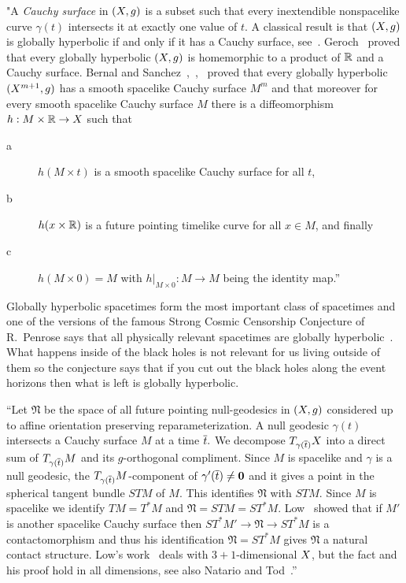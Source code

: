 \documentclass[12pt,reqno,a4paper]{amsart}
\begin{document}
"A {\it Cauchy surface\/} in $(\ss, g)$ is a subset such that every inextendible nonspacelike curve 
$\gamma(t)$ intersects it at exactly one value of $t.$ A classical result is that $(\ss, g)$ is globally 
hyperbolic if and only if it has a Cauchy surface, see~\cite[pages 211-212]{HawkingEllis}. 
Geroch~\cite{Geroch} proved that every globally hyperbolic $(\ss, g)$ is homemorphic to a product of $\R$ 
and a Cauchy surface. Bernal and Sanchez~\cite[Theorem 1]{BernalSanchez},~\cite[Theorem
1.1]{BernalSanchezMetricSplitting},~\cite[Theorem 1.2]{BernalSanchezFurther} proved that every globally 
hyperbolic $(\ss^{m+1}, g)$ has a smooth spacelike Cauchy surface $M^m$ and that moreover
for every smooth spacelike Cauchy surface $M$ there is a
diffeomorphism  $h:M\times \R\to \ss$ such that 
\begin{description}
\item[a] $h(M\times t)$ is a smooth spacelike Cauchy surface
for all $t$, 
\item[b] $h(x\times \R)$ is a future pointing timelike curve for all $x\in M$, and finally 
\item[c] $h(M\times 0)=M$ with $h|_{M\times 0}:M\to M$ being the identity map.''
\end{description}


Globally hyperbolic spacetimes form the most important class of spacetimes and one of the versions of the famous Strong Cosmic Censorship Conjecture of R.~Penrose says that all physically relevant spacetimes are globally hyperbolic~\cite{Penrose}. What happens inside of the black holes is not relevant for us living outside of them so the conjecture says that if you cut out the black holes along the event horizons then what is left is globally hyperbolic.


``Let $\mathfrak N$ be the space of all future pointing null-geodesics in $(\ss, g)$ considered up to affine 
orientation preserving reparameterization.
A null geodesic $\gamma(t)$ intersects a Cauchy surface $M$ at a 
time $\ov t.$ We decompose $T_{\gamma(\ov t)}\ss$ into a direct sum of $T_{\gamma(\ov t)}M$ and its 
$g$-orthogonal compliment. Since $M$ is spacelike and $\gamma$ is a null geodesic, 
the $T_{\gamma(\ov t)}M$-component of $\gamma'(\ov t)\neq {\bf 0}$ and it gives a point in the spherical 
tangent bundle $STM$ of $M.$ This identifies $\mathfrak N$ with $STM$. Since $M$ is spacelike we identify 
$TM=T^*M$ and $\mathfrak N=STM=ST^*M.$ Low~\cite{LowLegendrian} showed that if $M'$ is another spacelike
Cauchy surface then $ST^*M'\to \mathfrak N\to ST^*M$ is a contactomorphism and thus his identification 
$\mathfrak N=ST^*M$  gives $\mathfrak N$ a natural contact structure. 
Low's work~\cite{Low0, LowLegendrian} deals with $3+1$-dimensional $\ss$, but the fact and his proof hold in all 
dimensions, see also Natario and Tod~\cite[pages 252-253]{NatarioTod}.''
\end{document}
